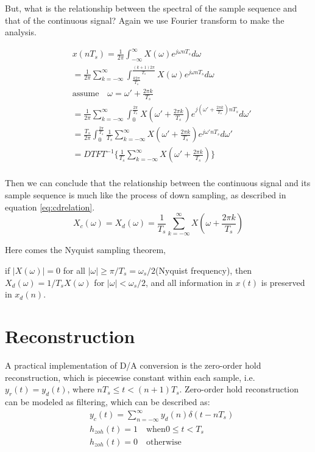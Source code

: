 But, what is the relationship between the spectral of the sample sequence and 
that of the continuous signal? Again we use Fourier transform to make the analysis.

\begin{equation}
\begin{aligned}
& x(nT_s)  = \frac{1}{2\pi}\int_{-\infty}^{\infty}X(\omega)e^{j\omega n T_s} d\omega \\
& = \frac{1}{2\pi}\sum_{k=-\infty}^{\infty}\int_{\frac{k2\pi}{T_s}}^{\frac{(k+1)2\pi}{T_s}}X(\omega)e^{j\omega n T_s} d\omega \\
& \text{assume} \quad \omega  = \omega ' + \frac{2\pi k}{T_s}\\
& = \frac{1}{2\pi}\sum_{k=-\infty}^{\infty}\int_{0}^{\frac{2\pi}{T_s}}
X(\omega' +\frac{2\pi k}{T_s})e^{j(\omega' + \frac{2\pi k}{T_s}) n T_s} d\omega' \\
& = \frac{T_s}{2\pi}\int_{0}^{\frac{2\pi}{T_s}}\frac{1}{T_s}\sum_{k=-\infty}^{\infty}
X(\omega' +\frac{2\pi k}{T_s})e^{j\omega'  n T_s} d\omega' \\
& = DTFT^{-1}\{\frac{1}{T_s}\sum_{k=-\infty}^{\infty}X(\omega' +\frac{2\pi k}{T_s})\}\\
\end{aligned}
\label{eq:xdx}
\end{equation}

Then we can conclude that the relationship between the continuous signal and its sample 
sequence is much like the process of down sampling, as described in equation \ref{eq:cdrelation}.
\begin{equation}
X_c(\omega) = X_d(\omega) = \frac{1}{T_s} \sum_{k=-\infty}^{\infty}X(\omega+\frac{2\pi k}{T_s})
\label{eq:cdrelation}
\end{equation}

Here comes the Nyquist sampling theorem,
\begin{theorem}
if $|X(\omega)|=0$ for all $|\omega| \ge \pi/T_s = \omega_s/2$(Nyquist frequency),
then $X_d(\omega) = 1/T_s X(\omega)$ for $|\omega| < \omega_s/2$, and all 
information in $x(t)$ is preserved in $x_d(n)$. 
\end{theorem}

\section*{Reconstruction}

A practical implementation of D/A conversion is the zero-order hold reconstruction, 
which is piecewise constant within each sample, i.e. $y_r(t) = y_d(t)$, where 
$nT_s  \le t < (n+1)T_s$. Zero-order hold reconstruction can be modeled as 
filtering, which can be described as:
\begin{equation}
\begin{aligned}
& y_c(t)  = \sum_{n=-\infty}^{\infty}y_d(n)\delta(t-nT_s)\\
& h_{zoh}(t)  = 1 \quad  \text{when} 0 \le t < T_s \\
& h_{zoh}(t)  = 0 \quad  \text{otherwise}\\
\end{aligned}
\end{equation}

